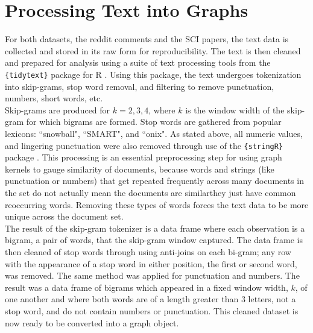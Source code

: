 %
%
%

\section{Processing Text into Graphs}

For both datasets, the reddit comments and the SCI papers, the text data is collected and stored in its raw form for reproducibility. The text is then cleaned and prepared for analysis using a suite of text processing tools from the \texttt{\{tidytext\}} package for R \cite{silge2016tidytext}. Using this package, the text undergoes tokenization into skip-grams, stop word removal, and filtering to remove punctuation, numbers, short words, etc. \\
Skip-grams are produced for $k=2,3,4$, where $k$ is the window width of the skip-gram for which bigrams are formed. Stop words are gathered from popular lexicons: ``snowball", ``SMART", and ``onix". As stated above, all numeric values, and lingering punctuation were also removed through use of the \texttt{\{stringR\}} package \cite{wickham2010stringr}. This processing is an essential preprocessing step for using graph kernels to gauge similarity of documents, because words and strings (like punctuation or numbers) that get repeated frequently across many documents in the set do not actually mean the documents are similar\textemdash they just have common reoccurring words. Removing these types of words forces the text data to be more unique across the document set.  \\
The result of the skip-gram tokenizer is a data frame where each observation is a bigram, a pair of words, that the skip-gram window captured. The data frame is then cleaned of stop words through using anti-joins on each bi-gram; any row with the appearance of a stop word in either position, the first or second word, was removed. The same method was applied for punctuation and numbers. The result was a data frame of bigrams which appeared in a fixed window width, $k$, of one another and where both words are of a length greater than 3 letters, not a stop word, and do not contain numbers or punctuation. This cleaned dataset is now ready to be converted into a graph object. \\
